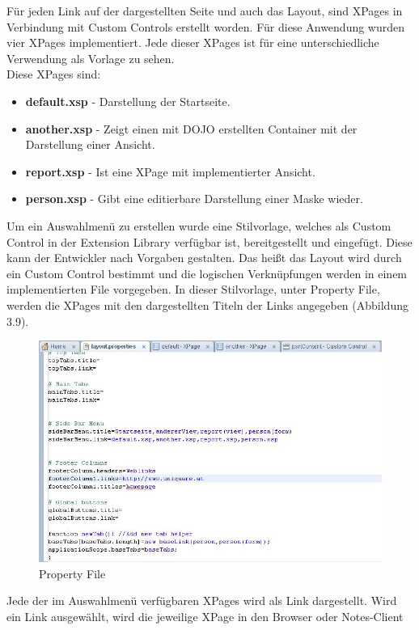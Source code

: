 Für jeden Link auf der dargestellten Seite und auch das Layout, sind XPages in Verbindung mit Custom Controls erstellt worden.
Für diese Anwendung wurden vier XPages implementiert. Jede dieser XPages ist für eine unterschiedliche Verwendung als Vorlage zu sehen.\\
\newline
Diese XPages sind:
\begin{itemize}
\item \textbf{default.xsp} - Darstellung der Startseite.
\item\textbf{ another.xsp} - Zeigt einen mit DOJO erstellten Container mit der Darstellung einer Ansicht\cite{steyer}.
\item \textbf{report.xsp} - Ist eine XPage mit implementierter Ansicht.
\item \textbf{person.xsp} - Gibt eine editierbare Darstellung einer Maske wieder.
\end{itemize}
Um ein Auswahlmenü zu erstellen wurde eine Stilvorlage, welches als Custom Control in der Extension Library verfügbar ist, bereitgestellt und 
eingefügt. Diese kann der Entwickler nach Vorgaben gestalten. Das heißt das Layout wird durch ein Custom Control bestimmt und die logischen
Verknüpfungen werden in einem implementierten File vorgegeben. In dieser Stilvorlage, unter Property File, werden die XPages mit den 
dargestellten Titeln der Links angegeben (Abbildung 3.9). 
\begin{figure}[H]
    \centerline{\includegraphics[scale=0.4]{pics/layoutproperties}}
    \caption[Haupt-Menü der Anwendung]{\label{FiG:Haupt-Menü der Anwendung}
	Property File }
\end{figure}
Jede der im Auswahlmenü verfügbaren XPages wird als Link dargestellt. Wird ein Link ausgewählt, wird die jeweilige XPage in den Browser oder Notes-Client
